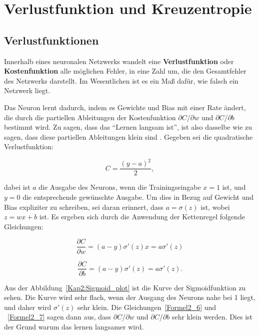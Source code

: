         \section{Verlustfunktion und Kreuzentropie}
        \subsection{Verlustfunktionen}
        Innerhalb eines neuronalen Netzwerks wandelt eine \textbf{Verlustfunktion} oder \textbf{Kostenfunktion} alle möglichen Fehler, in eine Zahl um, die den Gesamtfehler des Netzwerks darstellt. Im Wesentlichen ist es ein Maß dafür, wie falsch ein Netzwerk liegt.

        Das Neuron lernt dadurch, indem es Gewichte und Bias mit einer Rate ändert, die durch die partiellen Ableitungen der Kostenfunktion $\partial$$C$/$\partial$$w$ und $\partial$$C$/$\partial$$b$ bestimmt wird. Zu sagen, dass das \enquote{Lernen langsam ist}, ist also dasselbe wie zu sagen, dass diese partiellen Ableitungen klein sind \cite*[61]{Nielsen2015}. Gegeben sei die quadratische Verlustfunktion:

        \begin{equation} \label{Formel2_5}
            C=\frac{( y-a)^{2}}{2},
        \end{equation}

        dabei ist $a$ die Ausgabe des Neurons, wenn die Trainingseingabe $x = 1$ ist, und $y = 0$ die entsprechende gewünschte Ausgabe. Um dies in Bezug auf Gewicht und Bias expliziter zu schreiben, sei daran erinnert, dass $a = \sigma(z)$ ist, wobei $z = wx + b$ ist. Es ergeben sich durch die Anwendung der Kettenregel folgende Gleichungen:

        \begin{equation} \label{Formel2_6}
            \frac{\partial C}{\partial w} =( a-y) \sigma '( z) x=a\sigma '( z)
        \end{equation}

        \begin{equation} \label{Formel2_7}
            \frac{\partial C}{\partial b} =( a-y) \sigma '( z) =a\sigma '( z).
        \end{equation}
        
        Aus der Abbildung~\ref{Kap2:Sigmoid_plot} ist die Kurve der Sigmoidfunktion zu sehen. Die Kurve wird sehr flach, wenn der Ausgang des Neurons nahe bei 1 liegt, und daher wird $\sigma'(z)$ sehr klein. Die Gleichungen~\ref{Formel2_6} und ~\ref{Formel2_7} sagen dann aus, dass $\partial$$C$/$\partial$$w$  und  $\partial$$C$/$\partial$$b$ sehr klein werden. Dies ist der Grund warum das lernen langsamer wird.

